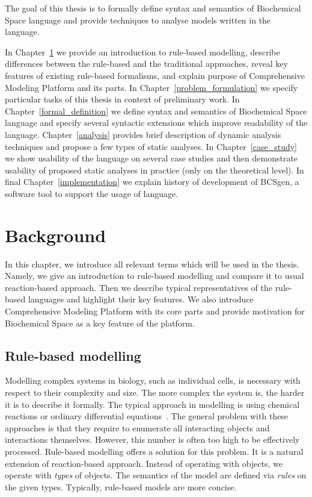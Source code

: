 \documentclass[12pt]{fithesis2}
\begin{document}
The goal of this thesis is to formally define syntax and semantics of Biochemical Space language and provide techniques to analyse models written in the language. 

In Chapter~\ref{background} we provide an introduction to rule-based modelling, describe differences between the rule-based and the traditional approaches, reveal key features of existing rule-based formalisms, and explain purpose of Comprehensive Modeling Platform and its parts. In Chapter~\ref{problem_formulation} we specify particular tasks of this thesis in context of preliminary work. In Chapter~\ref{formal_definition} we define syntax and semantics of Biochemical Space language and specify several syntactic extensions which improve readability of the language. Chapter~\ref{analysis} provides brief description of dynamic analysis techniques and propose a few types of static analyses. In Chapter~\ref{case_study} we show usability of the language on several case studies and then demonstrate usability of proposed static analyses in practice (only on the theoretical level). In final Chapter~\ref{implementation} we explain history of development of BCSgen, a software tool to support the usage of language. 

\chapter{Background}
\label{background}

In this chapter, we introduce all relevant terms which will be used in the thesis. Namely, we give an introduction to rule-based modelling and compare it to usual reaction-based approach. Then we describe typical representatives of the rule-based languages and highlight their key features. We also introduce Comprehensive Modeling Platform with its core parts and provide motivation for Biochemical Space as a key feature of the platform.

\section{Rule-based modelling}
\label{Rule-based basics}

Modelling complex systems in biology, such as individual cells, is necessary with respect to their complexity and size. The more complex the system is, the harder it is to describe it formally. The typical approach in modelling is using chemical reactions or ordinary differential equations~\cite{coddington1955theory}. The general problem with these approaches is that they require to enumerate all interacting objects and interactions themselves. However, this number is often too high to be effectively processed. Rule-based modelling offers a solution for this problem. It is a natural extension of reaction-based approach. Instead of operating with objects, we operate with \emph{types} of objects. The semantics of the model are defined via \emph{rules} on the given types. Typically, rule-based models are more concise.
\end{document}
